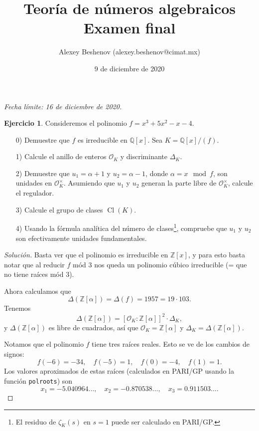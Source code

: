 \documentclass{article}
\title{Teoría de números algebraicos\\Examen final}
\author{Alexey Beshenov (alexey.beshenov@cimat.mx)}
\date{9 de diciembre de 2020}
\theoremstyle{definition}
\newtheorem{ejercicio}{Ejercicio}
\newenvironment{solucion}{\begin{proof}[Solución]}{\end{proof}}
\DeclareMathOperator{\Cl}{Cl}
\newcommand{\ZZ}{\mathbb{Z}}
\newcommand{\QQ}{\mathbb{Q}}
\renewcommand{\O}{\mathcal{O}}
\begin{document}
{\sffamily\bfseries\maketitle}

\ifdefined\solutions
\else
\thispagestyle{empty}
\fi

\noindent\emph{Fecha límite: 16 de diciembre de 2020.}

\begin{ejercicio}
  Consideremos el polinomio $f = x^3 + 5x^2 - x - 4$.

  \begin{enumerate}
  \item[0)] Demuestre que $f$ es irreducible en $\QQ [x]$.
    Sea $K = \QQ [x]/(f)$.

  \item[1)] Calcule el anillo de enteros $\O_K$ y discriminante $\Delta_K$.

  \item[2)] Demuestre que $u_1 = \alpha + 1$ y $u_2 = \alpha - 1$, donde
    $\alpha = x \mod f$, son unidades en $\O_K^\times$. Asumiendo que $u_1$ y
    $u_2$ generan la parte libre de $\O_K^\times$, calcule el regulador.

  \item[3)] Calcule el grupo de clases $\Cl (K)$.

  \item[4)] Usando la fórmula analítica del número de clases\footnote{El residuo
      de $\zeta_K (s)$ en $s=1$ puede ser calculado en PARI/GP.}, compruebe que
    $u_1$ y $u_2$ son efectivamente unidades fundamentales.
  \end{enumerate}

  \ifdefined\solutions
  \begin{solucion}
    Basta ver que el polinomio es irreducible en $\ZZ [x]$, y para esto basta
    notar que al reducir $f$ mód $3$ nos queda un polinomio cúbico irreducible
    (= que no tiene raíces mód $3$).

    Ahora calculamos que
    $$\Delta (\ZZ [\alpha]) = \Delta (f) = 1957 = 19\cdot 103.$$
    Tenemos
    $$\Delta (\ZZ [\alpha]) = [\O_K : \ZZ[\alpha]]^2\cdot \Delta_K,$$
    y $\Delta (\ZZ [\alpha])$ es libre de cuadrados, así que
    $\O_K = \ZZ[\alpha]$ y $\Delta_K = \Delta (\ZZ [\alpha])$.

    Notamos que el polinomio $f$ tiene tres raíces
    reales. Esto se ve de los cambios de signos:
    \[ f (-6) = -34, \quad
       f (-5) = 1, \quad
       f (0) = -4, \quad
       f (1) = 1. \]
    Los valores aproximados de estas raíces (calculados en PARI/GP usando la
    función \texttt{polroots}) son
    \[ x_1 = -5.040964\ldots, \quad
       x_2 = -0.870538\ldots, \quad
       x_3 =  0.911503\ldots. \]


\end{solucion}
\end{ejercicio}
\end{document}

